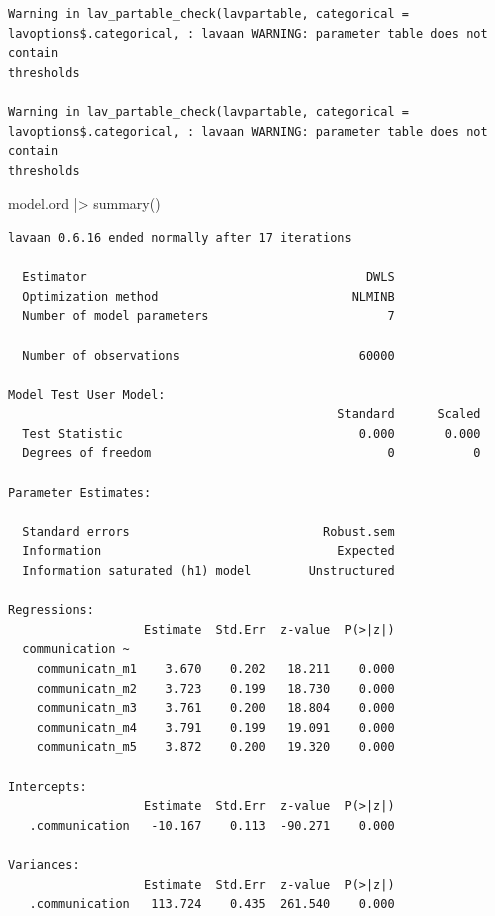 \documentclass[
  letterpaper,
  DIV=11,
  numbers=noendperiod]{scrreprt}
\newenvironment{Shaded}{\begin{snugshade}}{\end{snugshade}}
\newcommand{\FunctionTok}[1]{\textcolor[rgb]{0.28,0.35,0.67}{#1}}
\newcommand{\NormalTok}[1]{\textcolor[rgb]{0.00,0.23,0.31}{#1}}
\newcommand{\SpecialCharTok}[1]{\textcolor[rgb]{0.37,0.37,0.37}{#1}}
\begin{document}
\begin{verbatim}
Warning in lav_partable_check(lavpartable, categorical =
lavoptions$.categorical, : lavaan WARNING: parameter table does not contain
thresholds

Warning in lav_partable_check(lavpartable, categorical =
lavoptions$.categorical, : lavaan WARNING: parameter table does not contain
thresholds
\end{verbatim}

\begin{Shaded}
\begin{Highlighting}[]
\NormalTok{model.ord }\SpecialCharTok{|\textgreater{}} \FunctionTok{summary}\NormalTok{()}
\end{Highlighting}
\end{Shaded}

\begin{verbatim}
lavaan 0.6.16 ended normally after 17 iterations

  Estimator                                       DWLS
  Optimization method                           NLMINB
  Number of model parameters                         7

  Number of observations                         60000

Model Test User Model:
                                              Standard      Scaled
  Test Statistic                                 0.000       0.000
  Degrees of freedom                                 0           0

Parameter Estimates:

  Standard errors                           Robust.sem
  Information                                 Expected
  Information saturated (h1) model        Unstructured

Regressions:
                   Estimate  Std.Err  z-value  P(>|z|)
  communication ~                                     
    communicatn_m1    3.670    0.202   18.211    0.000
    communicatn_m2    3.723    0.199   18.730    0.000
    communicatn_m3    3.761    0.200   18.804    0.000
    communicatn_m4    3.791    0.199   19.091    0.000
    communicatn_m5    3.872    0.200   19.320    0.000

Intercepts:
                   Estimate  Std.Err  z-value  P(>|z|)
   .communication   -10.167    0.113  -90.271    0.000

Variances:
                   Estimate  Std.Err  z-value  P(>|z|)
   .communication   113.724    0.435  261.540    0.000
\end{verbatim}
\end{document}

